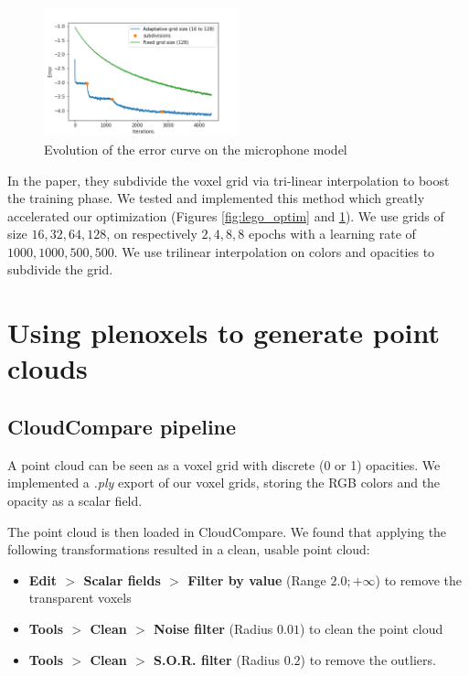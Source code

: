 \documentclass{article}
\begin{document}
\begin{figure}[!h]
\centering
\includegraphics[width=0.5\textwidth]{figs/training_mic.png}
\caption{\label{fig:subd} Evolution of the error curve on the microphone model}
\end{figure}

In the paper, they subdivide the voxel grid via tri-linear interpolation to boost the training phase. We tested and implemented this method which greatly accelerated our optimization (Figures \ref{fig:lego_optim} and \ref{fig:subd}). We use grids of size ${16, 32, 64, 128}$, on respectively ${2, 4, 8, 8}$ epochs with a learning rate of ${1000, 1000, 500, 500}$. We use trilinear interpolation on colors and opacities to subdivide the grid.


\section{Using plenoxels to generate point clouds}

\subsection{CloudCompare pipeline}

A point cloud can be seen as a voxel grid with discrete (0 or 1) opacities. We implemented a \textit{.ply} export of our voxel grids, storing the RGB colors and the opacity as a scalar field. 

The point cloud is then loaded in CloudCompare. We found that applying the following transformations resulted in a clean, usable point cloud:

\begin{itemize}
\item \textbf{Edit $>$ Scalar fields $>$ Filter by value} (Range $2.0; +\infty$) to remove the transparent voxels
\item \textbf{Tools $>$ Clean $>$ Noise filter} (Radius $0.01$) to clean the point cloud
\item \textbf{Tools $>$ Clean $>$ S.O.R. filter} (Radius $0.2$) to remove the outliers.
\end{itemize}
\end{document}
